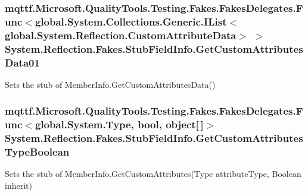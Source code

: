 \hypertarget{class_system_1_1_reflection_1_1_fakes_1_1_stub_field_info_a2552105ca2991820842736b3a012b38f}{
\subsubsection[{Get\-Custom\-Attributes\-Data01}]{\setlength{\rightskip}{0pt plus 5cm}mqttf.\-Microsoft.\-Quality\-Tools.\-Testing.\-Fakes.\-Fakes\-Delegates.\-Func$<$global.\-System.\-Collections.\-Generic.\-I\-List$<$global.\-System.\-Reflection.\-Custom\-Attribute\-Data$>$ $>$ System.\-Reflection.\-Fakes.\-Stub\-Field\-Info.\-Get\-Custom\-Attributes\-Data01}}\label{class_system_1_1_reflection_1_1_fakes_1_1_stub_field_info_a2552105ca2991820842736b3a012b38f}


Sets the stub of Member\-Info.\-Get\-Custom\-Attributes\-Data()

\hypertarget{class_system_1_1_reflection_1_1_fakes_1_1_stub_field_info_a9c442faec8aa9b72af8c1f5da1b9555d}{
\subsubsection[{Get\-Custom\-Attributes\-Type\-Boolean}]{\setlength{\rightskip}{0pt plus 5cm}mqttf.\-Microsoft.\-Quality\-Tools.\-Testing.\-Fakes.\-Fakes\-Delegates.\-Func$<$global.\-System.\-Type, bool, object\mbox{[}$\,$\mbox{]}$>$ System.\-Reflection.\-Fakes.\-Stub\-Field\-Info.\-Get\-Custom\-Attributes\-Type\-Boolean}}\label{class_system_1_1_reflection_1_1_fakes_1_1_stub_field_info_a9c442faec8aa9b72af8c1f5da1b9555d}


Sets the stub of Member\-Info.\-Get\-Custom\-Attributes(\-Type attribute\-Type, Boolean inherit)

